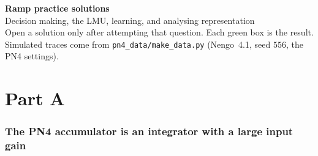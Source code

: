 \documentclass[11pt,letterpaper]{article}
\begin{document}
\begin{center}
{\Large\bfseries Ramp practice solutions}\\[2pt]
{\large Decision making, the LMU, learning, and analysing representation}\\[4pt]
Open a solution only after attempting that question. Each green box is the result.\\
Simulated traces come from \texttt{pn4\_data/make\_data.py} (Nengo~4.1, seed $556$, the PN4 settings).
\end{center}

\part*{Part A}

\section{The PN4 accumulator is an integrator with a large input gain}
\end{document}
